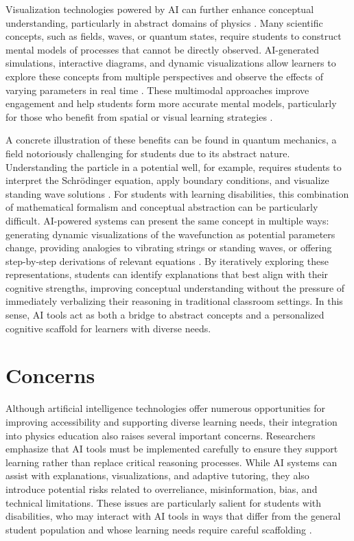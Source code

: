 \documentclass[]{aastex701}
\begin{document}
Visualization technologies powered by AI can further enhance conceptual understanding, particularly in abstract domains of physics \citep{Liang2026}. Many scientific concepts, such as fields, waves, or quantum states, require students to construct mental models of processes that cannot be directly observed. AI-generated simulations, interactive diagrams, and dynamic visualizations allow learners to explore these concepts from multiple perspectives and observe the effects of varying parameters in real time \citep{Voultsiou2025, HarkinsBrown2025, Liang2026}. These multimodal approaches improve engagement and help students form more accurate mental models, particularly for those who benefit from spatial or visual learning strategies \citep{Voultsiou2025, HarkinsBrown2025}.

A concrete illustration of these benefits can be found in quantum mechanics, a field notoriously challenging for students due to its abstract nature. Understanding the particle in a potential well, for example, requires students to interpret the Schr\"{o}dinger equation, apply boundary conditions, and visualize standing wave solutions \citep{Singh2001}. For students with learning disabilities, this combination of mathematical formalism and conceptual abstraction can be particularly difficult. AI-powered systems can present the same concept in multiple ways: generating dynamic visualizations of the wavefunction as potential parameters change, providing analogies to vibrating strings or standing waves, or offering step-by-step derivations of relevant equations \citep{Singh2001, Finkelstein2005}. By iteratively exploring these representations, students can identify explanations that best align with their cognitive strengths, improving conceptual understanding without the pressure of immediately verbalizing their reasoning in traditional classroom settings. In this sense, AI tools act as both a bridge to abstract concepts and a personalized cognitive scaffold for learners with diverse needs.


\section{Concerns}

Although artificial intelligence technologies offer numerous opportunities for improving accessibility and supporting diverse learning needs, their integration into physics education also raises several important concerns. Researchers emphasize that AI tools must be implemented carefully to ensure they support learning rather than replace critical reasoning processes. While AI systems can assist with explanations, visualizations, and adaptive tutoring, they also introduce potential risks related to overreliance, misinformation, bias, and technical limitations. These issues are particularly salient for students with disabilities, who may interact with AI tools in ways that differ from the general student population and whose learning needs require careful scaffolding \citep{Paglialunga2025, Voultsiou2025}.
\end{document}

